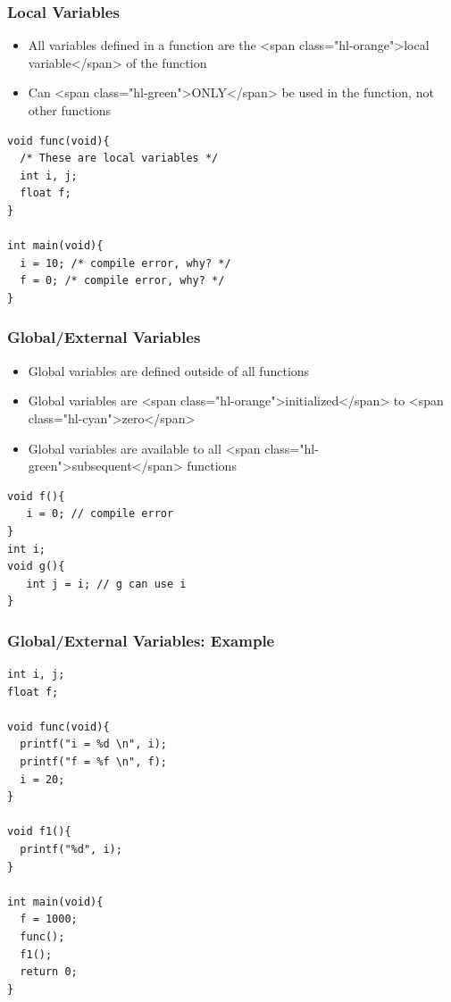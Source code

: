 \documentclass{../c-lecture}
\begin{document}
\begin{frame}
  \frametitle{Local Variables}
  \begin{itemize}
    \item
      All variables defined in a function are the
      <span class="hl-orange">local variable</span> of the function

    \item
      Can <span class="hl-green">ONLY</span> be used in the function, not other
      functions

  \end{itemize}
  \begin{verbatim}
void func(void){
  /* These are local variables */
  int i, j;
  float f;
}

int main(void){
  i = 10; /* compile error, why? */
  f = 0; /* compile error, why? */
}
  \end{verbatim}
\end{frame}

\begin{frame}[fragile]
  \frametitle{Global/External Variables}
  \begin{itemize}
    \item Global variables are defined outside of all functions
    \item
      Global variables are <span class="hl-orange">initialized</span> to
      <span class="hl-cyan">zero</span>

    \item
      Global variables are available to all
      <span class="hl-green">subsequent</span> functions

  \end{itemize}
  \begin{verbatim}
void f(){
   i = 0; // compile error
}
int i;
void g(){
   int j = i; // g can use i
}
  \end{verbatim}
\end{frame}

\begin{frame}[fragile]
  \frametitle{Global/External Variables: Example}
  \begin{verbatim}
int i, j;
float f;

void func(void){
  printf("i = %d \n", i);
  printf("f = %f \n", f);
  i = 20;
}

void f1(){
  printf("%d", i);
}

int main(void){
  f = 1000;
  func();
  f1();
  return 0;
}
  \end{verbatim}
\end{frame}
\end{document}
